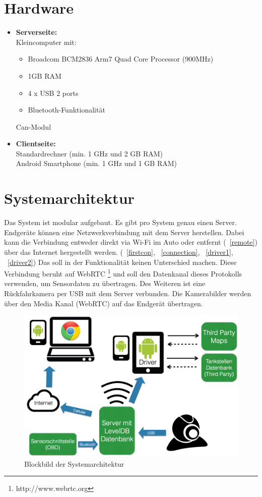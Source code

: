\documentclass[pflichtenheft.tex]{subfiles}
\begin{document}
\section{Hardware}
\begin{itemize}
\item
\textbf{Serverseite:}\\
Kleincomputer mit:
\begin{itemize}
\item
Broadcom BCM2836 Arm7 Quad Core Processor (900MHz)
\item
1GB RAM
\item
4 x USB 2 ports
\item
Bluetooth-Funktionalität
\end{itemize}
Can-Modul
\item
\textbf{Clientseite:}\\
Standardrechner (min. 1 GHz und 2 GB RAM)\\
Android Smartphone (min. 1 GHz und 1 GB RAM)
\end{itemize}


\newpage
\section{Systemarchitektur}

Das System ist modular aufgebaut. Es gibt pro System genau einen Server. Endgeräte können eine Netzwerkverbindung mit dem Server herstellen. Dabei kann die Verbindung entweder direkt via Wi-Fi im Auto oder entfernt (~\ref{remote}) über das Internet hergestellt werden. (~\ref{firstcon}, ~\ref{connection}, ~\ref{driver1}, ~\ref{driver2}) Das soll in der Funktionalität keinen Unterschied machen. Diese Verbindung beruht auf WebRTC \footnote{http://www.webrtc.org} und soll den Datenkanal dieses Protokolls verwenden, um Sensordaten zu übertragen. Des Weiteren ist eine Rückfahrkamera per USB mit dem Server verbunden. Die Kamerabilder werden über den Media Kanal (WebRTC) auf das Endgerät übertragen.

\begin{figure}[H]
  	\begin{center}
 		\includegraphics[width=\textwidth]{Images/sysarch.png}
  		\caption{Blockbild der Systemarchitektur}
  	\end{center}
\end{figure}
\end{document}

